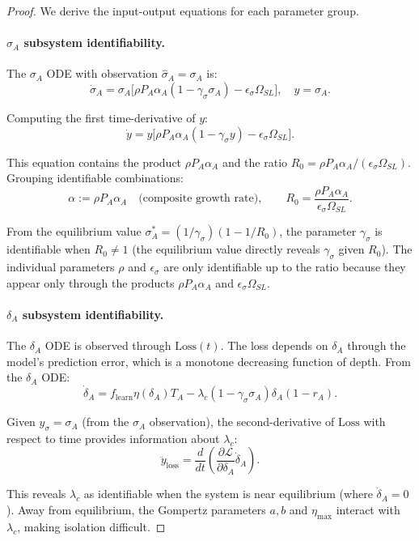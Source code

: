 \begin{proof}
We derive the input-output equations for each parameter group.

\paragraph{$\sigma_A$ subsystem identifiability.}
The $\sigma_A$ ODE with observation $\hat{\sigma}_A = \sigma_A$ is:
\[
\dot{\sigma}_A = \sigma_A \bigl[ \rho P_A \alpha_A (1 - \gamma_\sigma \sigma_A)
- \epsilon_\sigma \Omega_{SL} \bigr], \quad y = \sigma_A.
\]

Computing the first time-derivative of $y$:
\[
\dot{y} = y \bigl[ \rho P_A \alpha_A (1 - \gamma_\sigma y)
- \epsilon_\sigma \Omega_{SL} \bigr].
\]

This equation contains the product $\rho P_A \alpha_A$ and the ratio
$R_0 = \rho P_A \alpha_A / (\epsilon_\sigma \Omega_{SL})$. Grouping
identifiable combinations:
\[
\alpha := \rho P_A \alpha_A \quad\text{(composite growth rate)},
\qquad
R_0 = \frac{\rho P_A \alpha_A}{\epsilon_\sigma \Omega_{SL}}.
\]

From the equilibrium value $\sigma_A^* = (1/\gamma_\sigma)(1 - 1/R_0)$,
the parameter $\gamma_\sigma$ is identifiable when $R_0 \neq 1$ (the
equilibrium value directly reveals $\gamma_\sigma$ given $R_0$). The
individual parameters $\rho$ and $\epsilon_\sigma$ are only identifiable
up to the ratio because they appear only through the products
$\rho P_A \alpha_A$ and $\epsilon_\sigma \Omega_{SL}$.

\paragraph{$\delta_A$ subsystem identifiability.}
The $\delta_A$ ODE is observed through $\mathrm{Loss}(t)$. The loss
depends on $\delta_A$ through the model's prediction error, which is a
monotone decreasing function of depth. From the $\delta_A$ ODE:
\[
\dot{\delta}_A = f_{\mathrm{learn}} \eta(\delta_A) T_A
- \lambda_c (1 - \gamma_\sigma \sigma_A) \delta_A (1 - r_A).
\]

Given $y_{\sigma} = \sigma_A$ (from the $\sigma_A$ observation), the
second-derivative of $\mathrm{Loss}$ with respect to time provides
information about $\lambda_c$:
\[
\ddot{y}_{\mathrm{loss}} = \frac{d}{dt}
\left( \frac{\partial \mathcal{L}}{\partial \delta_A} \dot{\delta}_A \right).
\]

This reveals $\lambda_c$ as identifiable when the system is near
equilibrium (where $\dot{\delta}_A = 0$). Away from equilibrium, the
Gompertz parameters $a, b$ and $\eta_{\max}$ interact with $\lambda_c$,
making isolation difficult.


\end{proof}
